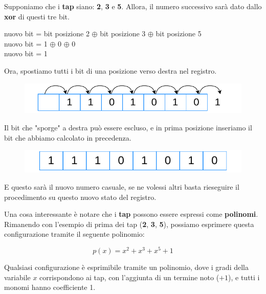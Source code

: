 \documentclass{rapport}
\begin{document}
Supponiamo che i \textbf{tap} siano: \textbf{2}, \textbf{3} e \textbf{5}.  
Allora, il numero successivo sarà dato dallo \textbf{xor} di questi tre bit.


\begin{center}
    nuovo bit = bit posizione 2 $\oplus$ bit posizione 3 $\oplus$ bit posizione 5 \\
    nuovo bit = 1 $\oplus$ 0 $\oplus$ 0 \\
    nuovo bit = 1
\end{center}

Ora, spostiamo tutti i bit di una posizione verso destra nel registro.


\begin{figure}[!h]
    \centering
    \includegraphics[width=0.7\linewidth]{logos/4_5cripto.pdf}
\end{figure}

Il bit che "sporge" a destra può essere escluso, e in prima posizione inseriamo il bit che abbiamo calcolato in precedenza.


\begin{figure}[!h]
    \centering
    \includegraphics[width=0.7\linewidth]{logos/4_6cripto.pdf}
\end{figure}

E questo sarà il nuovo numero casuale, se ne volessi altri basta rieseguire il procedimento su questo nuovo stato del registro.

\newpage

Una cosa interessante è notare che i \textbf{tap} possono essere espressi come \textbf{polinomi}.  
Rimanendo con l'esempio di prima dei tap (\textbf{2}, \textbf{3}, \textbf{5}), possiamo esprimere questa configurazione tramite il seguente polinomio:


\begin{equation*}
    p(x) = x^2 + x^3 + x^5 +1
\end{equation*}

Qualsiasi configurazione è esprimibile tramite un polinomio, dove i gradi della variabile $x$ corrispondono ai tap, con l'aggiunta di un termine noto ($+1$), e tutti i monomi hanno coefficiente 1.
\end{document}
